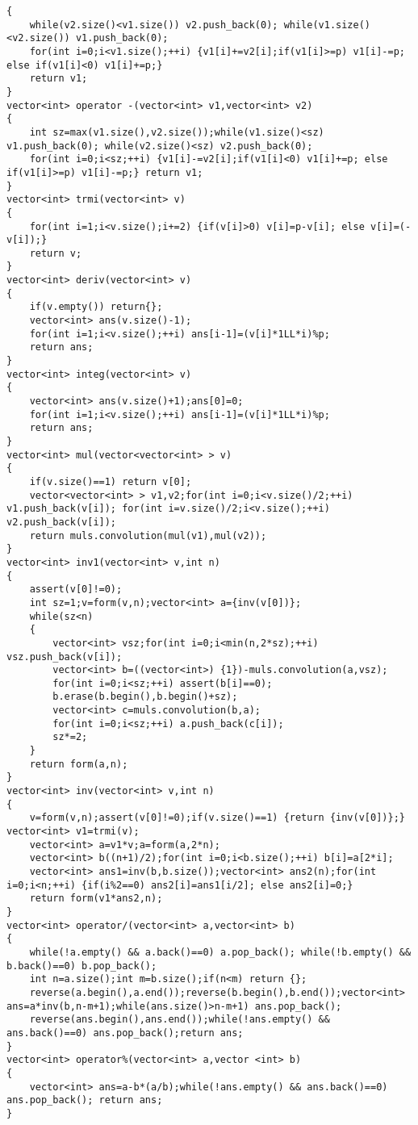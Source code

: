\begin{lstlisting}
{
    while(v2.size()<v1.size()) v2.push_back(0); while(v1.size()<v2.size()) v1.push_back(0);
    for(int i=0;i<v1.size();++i) {v1[i]+=v2[i];if(v1[i]>=p) v1[i]-=p; else if(v1[i]<0) v1[i]+=p;}
    return v1;
}
vector<int> operator -(vector<int> v1,vector<int> v2)
{
    int sz=max(v1.size(),v2.size());while(v1.size()<sz) v1.push_back(0); while(v2.size()<sz) v2.push_back(0);
    for(int i=0;i<sz;++i) {v1[i]-=v2[i];if(v1[i]<0) v1[i]+=p; else if(v1[i]>=p) v1[i]-=p;} return v1;
}
vector<int> trmi(vector<int> v)
{
    for(int i=1;i<v.size();i+=2) {if(v[i]>0) v[i]=p-v[i]; else v[i]=(-v[i]);}
    return v;
}
vector<int> deriv(vector<int> v)
{
    if(v.empty()) return{};
    vector<int> ans(v.size()-1);
    for(int i=1;i<v.size();++i) ans[i-1]=(v[i]*1LL*i)%p;
    return ans;
}
vector<int> integ(vector<int> v)
{
    vector<int> ans(v.size()+1);ans[0]=0;
    for(int i=1;i<v.size();++i) ans[i-1]=(v[i]*1LL*i)%p;
    return ans;
}
vector<int> mul(vector<vector<int> > v)
{
    if(v.size()==1) return v[0];
    vector<vector<int> > v1,v2;for(int i=0;i<v.size()/2;++i) v1.push_back(v[i]); for(int i=v.size()/2;i<v.size();++i) v2.push_back(v[i]);
    return muls.convolution(mul(v1),mul(v2));
}
vector<int> inv1(vector<int> v,int n)
{
    assert(v[0]!=0);
    int sz=1;v=form(v,n);vector<int> a={inv(v[0])};
    while(sz<n)
    {
        vector<int> vsz;for(int i=0;i<min(n,2*sz);++i) vsz.push_back(v[i]);
        vector<int> b=((vector<int>) {1})-muls.convolution(a,vsz);
        for(int i=0;i<sz;++i) assert(b[i]==0);
        b.erase(b.begin(),b.begin()+sz);
        vector<int> c=muls.convolution(b,a);
        for(int i=0;i<sz;++i) a.push_back(c[i]);
        sz*=2;
    }
    return form(a,n);
}
vector<int> inv(vector<int> v,int n)
{
    v=form(v,n);assert(v[0]!=0);if(v.size()==1) {return {inv(v[0])};} vector<int> v1=trmi(v);
    vector<int> a=v1*v;a=form(a,2*n);
    vector<int> b((n+1)/2);for(int i=0;i<b.size();++i) b[i]=a[2*i];
    vector<int> ans1=inv(b,b.size());vector<int> ans2(n);for(int i=0;i<n;++i) {if(i%2==0) ans2[i]=ans1[i/2]; else ans2[i]=0;}
    return form(v1*ans2,n);
}
vector<int> operator/(vector<int> a,vector<int> b)
{
    while(!a.empty() && a.back()==0) a.pop_back(); while(!b.empty() && b.back()==0) b.pop_back();
    int n=a.size();int m=b.size();if(n<m) return {};
    reverse(a.begin(),a.end());reverse(b.begin(),b.end());vector<int> ans=a*inv(b,n-m+1);while(ans.size()>n-m+1) ans.pop_back();
    reverse(ans.begin(),ans.end());while(!ans.empty() && ans.back()==0) ans.pop_back();return ans;
}
vector<int> operator%(vector<int> a,vector <int> b)
{
    vector<int> ans=a-b*(a/b);while(!ans.empty() && ans.back()==0) ans.pop_back(); return ans;
}
\end{lstlisting}